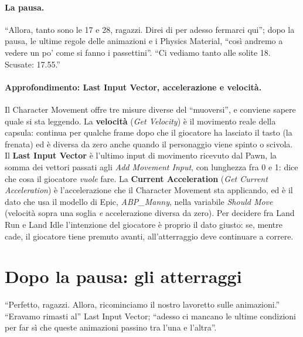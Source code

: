 \paragraph{La pausa.} ``Allora, tanto sono le 17 e 28, ragazzi. Direi di per adesso
fermarci qui''; dopo la pausa, le ultime regole delle animazioni e i Physics Material,
``così andremo a vedere un po' come si fanno i passettini''. ``Ci vediamo tanto alle solite
18. Scusate: 17.55.''

\paragraph{Approfondimento: Last Input Vector, accelerazione e velocità.} Il Character
Movement offre tre misure diverse del ``muoversi'', e conviene sapere quale si sta
leggendo. La \textbf{velocità} (\emph{Get Velocity}) è il movimento reale della capsula:
continua per qualche frame dopo che il giocatore ha lasciato il tasto (la frenata) ed è
diversa da zero anche quando il personaggio viene spinto o scivola. Il \textbf{Last Input
Vector} è l'ultimo input di movimento ricevuto dal Pawn, la somma dei vettori passati agli
\emph{Add Movement Input}, con lunghezza fra 0 e 1: dice che cosa il giocatore
\emph{vuole} fare. La \textbf{Current Acceleration} (\emph{Get Current Acceleration}) è
l'accelerazione che il Character Movement sta applicando, ed è il dato che usa il modello
di Epic, \emph{ABP\_Manny}, nella variabile \emph{Should Move} (velocità sopra una
soglia \emph{e} accelerazione diversa da zero). Per decidere fra Land Run e Land Idle
l'intenzione del giocatore è proprio il dato giusto: se, mentre cade, il giocatore tiene
premuto avanti, all'atterraggio deve continuare a correre.

\section{Dopo la pausa: gli atterraggi}
\label{ue10:sec:transizioni2}

``Perfetto, ragazzi. Allora, ricominciamo il nostro lavoretto sulle animazioni.''
``Eravamo rimasti al'' Last Input Vector; ``adesso ci mancano le ultime condizioni per far
sì che queste animazioni passino tra l'una e l'altra''.

